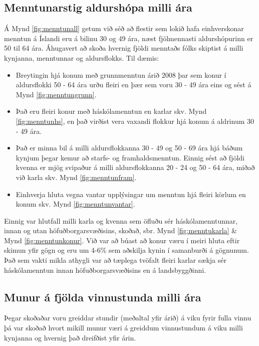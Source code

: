 \documentclass[12pt, git, final]{rureport}
\begin{document}
\subsection{Menntunarstig aldurshópa milli ára}
Á Mynd \ref{fig:menntunall} getum við séð að flestir sem lokið hafa einhverskonar menntun á Íslandi eru á bilinu 30 og 49 ára, næst fjölmennasti aldurshópurinn er 50 til 64 ára.
Áhugavert að skoða hvernig fjöldi menntaðs fólks skiptist á milli kynjanna, menntunnar og aldursflokks. Til dæmis:
\begin{itemize}  
	
	\item Breytingin hjá konum með grunnmenntun árið 2008 þar sem konur í aldursflokki 50 - 64 ára urðu fleiri en þær sem voru 30 - 49 ára eins og sést á Mynd \ref{fig:menntungrunn}.
	
	\item Það eru fleiri konur með háskólamenntun en karlar skv. Mynd \ref{fig:menntunhs}, en það virðist vera vaxandi flokkur hjá konum á aldrinum 30 - 49 ára.
	
	
	\item Það er minna bil á milli aldursflokkanna 30 - 49 og 50 - 69 ára hjá báðum kynjum þegar kemur að starfs- og framhaldsmenntun. Einnig sést að fjöldi kvenna er mjög svipaður á milli aldursflokkanna 20 - 24 og 50 - 64 ára, miðað við karla skv. Mynd \ref{fig:menntunfram}.
	
	\item Einhverja hluta vegna vantar upplýsingar um menntun hjá fleiri körlum en konum skv. Mynd \ref{fig:menntunvantar}.
	
\end{itemize}
Einnig var hlutfall milli karla og kvenna sem öfluðu sér háskólamenntunnar, innan og utan höfuðborgarsvæðisins, skoðað, sbr. Mynd \ref{fig:menntukarla} \& Mynd \ref{fig:menntunkonur}. Við var að búast að konur væru í meiri hluta eftir skimun yfir gögn og eru um 4-6\% sem aðskilja kynin í samanburði á gögnunum. Það sem vakti mikla athygli var að tæplega tvöfalt fleiri karlar sækja sér háskólamenntun innan höfuðborgarsvæðisins en á landsbyggðinni.



\subsection{Munur á fjölda vinnustunda milli ára}
Þegar skoðaðar voru greiddar stundir (meðaltal yfir árið) á viku fyrir fulla vinnu þá var skoðað hvort mikill munur væri á greiddum vinnustundum á viku milli kynjanna og hvernig það dreifðist yfir árin. 
\end{document}
